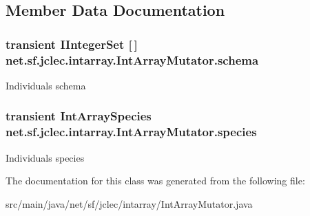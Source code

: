 \subsection{Member Data Documentation}
\hypertarget{classnet_1_1sf_1_1jclec_1_1intarray_1_1_int_array_mutator_a85a54fc7d4644e2448d472d97c1b1088}{
\subsubsection[{schema}]{\setlength{\rightskip}{0pt plus 5cm}transient {\bf I\-Integer\-Set} \mbox{[}$\,$\mbox{]} net.\-sf.\-jclec.\-intarray.\-Int\-Array\-Mutator.\-schema\hspace{0.3cm}{\ttfamily [protected]}}}\label{classnet_1_1sf_1_1jclec_1_1intarray_1_1_int_array_mutator_a85a54fc7d4644e2448d472d97c1b1088}
Individuals schema \hypertarget{classnet_1_1sf_1_1jclec_1_1intarray_1_1_int_array_mutator_a1d0354d02f6ffb46b65b513b17974fd5}{
\subsubsection[{species}]{\setlength{\rightskip}{0pt plus 5cm}transient {\bf Int\-Array\-Species} net.\-sf.\-jclec.\-intarray.\-Int\-Array\-Mutator.\-species\hspace{0.3cm}{\ttfamily [protected]}}}\label{classnet_1_1sf_1_1jclec_1_1intarray_1_1_int_array_mutator_a1d0354d02f6ffb46b65b513b17974fd5}
Individuals species 

The documentation for this class was generated from the following file\-:\begin{DoxyCompactItemize}
\item 
src/main/java/net/sf/jclec/intarray/Int\-Array\-Mutator.\-java\end{DoxyCompactItemize}
